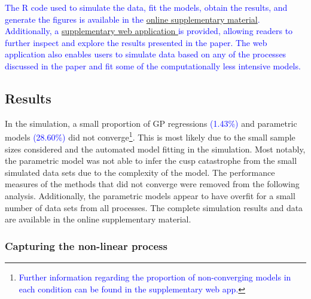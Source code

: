 \documentclass[man, floatsintext]{apa7}
\begin{document}
\textcolor{blue}{
  The R code used to simulate the data, fit the models, obtain
  the results, and generate the figures is available in the
  \href{https://osf.io/3ytdx/}{online supplementary material}. Additionally, a
  \href{https://jan-ian-failenschmid.shinyapps.io/modeling_non_linearity_app/}{
    supplementary web application } is provided, allowing readers to further
  inspect and explore the results presented in the paper. The web application
  also enables users to simulate data based on any of the processes discussed
  in
  the paper and fit some of the computationally less intensive models.
}

\subsection{Results}

In the simulation, a small proportion of GP regressions
\textcolor{blue}{(1.43\%)} and parametric models \textcolor{blue}{(28.60\%)}
did not converge\footnote{\textcolor{blue}{Further information regarding the
    proportion of non-converging models in each condition can be found in the
    supplementary web app.}}. This is most likely due to the small
sample
sizes considered
and the automated model fitting in the simulation. Most notably, the parametric
model was not able to infer the cusp catastrophe from the small simulated data
sets due to the complexity of the model. The performance measures of the
methods that did not converge were removed from the following analysis.
Additionally, the parametric models appear to have overfit for a small number
of data sets from all processes. The complete simulation results and data are
available in the online supplementary material.

\subsubsection{Capturing the non-linear process}
\end{document}
